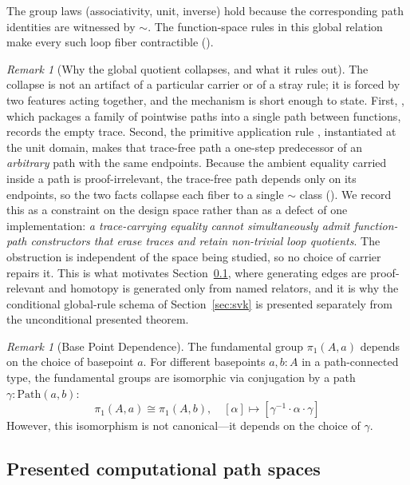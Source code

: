 \documentclass{lmcs}
\theoremstyle{definition}
\theoremstyle{plain}
\theoremstyle{remark}
\newtheorem{remark}[definition]{Remark}
\newcommand{\RwEq}{\sim}
\newcommand{\Path}{\mathrm{Path}}
\newcommand{\piOne}{\pi_1}
\begin{document}
The group laws (associativity, unit, inverse) hold because the corresponding
path identities are witnessed by $\RwEq$.  The function-space rules in this
global relation make every such loop fiber contractible
().

\begin{remark}[Why the global quotient collapses, and what it rules out]
\label{rem:collapse}
The collapse is not an artifact of a particular carrier or of a stray rule; it
is forced by two features acting together, and the mechanism is short enough to
state.  First, , which packages a family of pointwise paths
into a single path between functions, records the empty trace.  Second, the
primitive application rule , instantiated at the unit
domain, makes that trace-free path a one-step predecessor of an \emph{arbitrary}
path with the same endpoints.  Because the ambient equality carried inside a
path is proof-irrelevant, the trace-free path depends only on its endpoints, so
the two facts collapse each fiber to a single $\RwEq$ class
().
We record this as a constraint on the design space rather than as a defect of
one implementation: \emph{a trace-carrying equality cannot simultaneously admit
function-path constructors that erase traces and retain non-trivial loop
quotients}.  The obstruction is independent of the space being studied, so no
choice of carrier repairs it.  This is what motivates
Section~\ref{sec:presented-spaces}, where generating edges are proof-relevant
and homotopy is generated only from named relators, and it is why the
conditional global-rule schema of Section~\ref{sec:svk} is presented separately
from the unconditional presented theorem.
\end{remark}

\begin{remark}[Base Point Dependence]
\label{rem:basepoint}
The fundamental group $\piOne(A, a)$ depends on the choice of basepoint $a$. For different basepoints $a, b : A$ in a path-connected type, the fundamental groups are isomorphic via conjugation by a path $\gamma : \Path(a, b)$:
\[
\piOne(A, a) \cong \piOne(A, b), \quad [\alpha] \mapsto [\gamma^{-1} \cdot \alpha \cdot \gamma]
\]
However, this isomorphism is not canonical---it depends on the choice of $\gamma$.
\end{remark}

\subsection{Presented computational path spaces}
\label{sec:presented-spaces}
\end{document}
